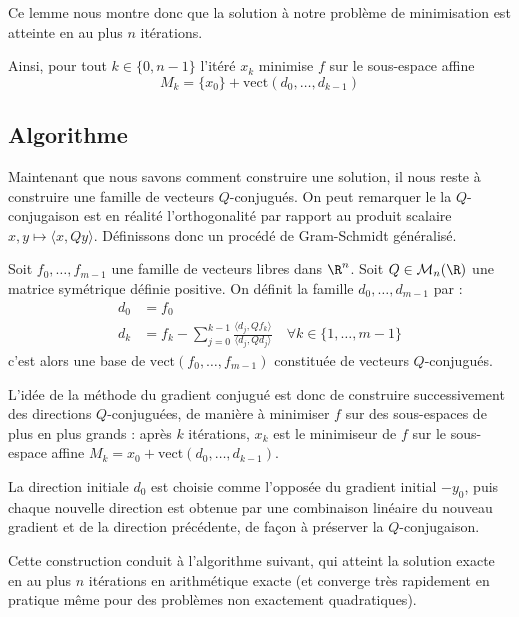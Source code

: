 Ce lemme nous montre donc que la solution à notre problème de minimisation est atteinte en au plus $n$ itérations. 

\begin{proposition}
    Ainsi, pour tout $ k \in \{0, n-1\}$ l'itéré $x_k$ minimise $f$ sur le sous-espace affine 
        $$ M_k = \{x_0\} + \text{vect}(d_0, \dots, d_{k-1})$$  
\end{proposition}

\subsection{Algorithme}

Maintenant que nous savons comment construire une solution, il nous reste à construire une famille de 
vecteurs $Q$-conjugués. On peut remarquer le la $Q$-conjugaison est en réalité l'orthogonalité par rapport 
au produit scalaire $ x,y \longmapsto \langle x, Qy \rangle $. 
Définissons donc un procédé de Gram-Schmidt généralisé. 

\begin{proposition}
    Soit $f_0, \dots, f_{m-1}$ une famille de vecteurs libres dans $\R^n$. Soit $Q \in \mathcal{M}_{n}(\R)$ une matrice 
    symétrique définie positive. On définit la famille $d_0, \dots, d_{m-1}$ par : 
        \begin{align*}
            d_0 &= f_0 \\ 
            d_k &= f_k - \sum_{j=0}^{k-1} \frac{ \langle d_j, Q f_k \rangle }{ \langle d_j, Q d_j \rangle }  \quad \forall k \in \{1, \dots, m-1\}
        \end{align*}
    c'est alors une base de $ \text{vect}(f_0, \dots, f_{m-1})$ constituée de vecteurs $Q$-conjugués.  
\end{proposition}

L'idée de la méthode du gradient conjugué est donc de construire successivement des directions 
$Q$-conjuguées, de manière à minimiser $f$ sur des sous-espaces de plus en plus grands : 
après $k$ itérations, $x_k$ est le minimiseur de $f$ sur le sous-espace affine 
$M_k = x_0 + \mathrm{vect}(d_0, \dots, d_{k-1})$. 


La direction initiale $d_0$ est choisie comme l'opposée du gradient initial $-y_0$, 
puis chaque nouvelle direction est obtenue par une combinaison linéaire du nouveau gradient et de la direction précédente, 
de façon à préserver la $Q$-conjugaison. 


Cette construction conduit à l'algorithme suivant, qui atteint la solution exacte 
en au plus $n$ itérations en arithmétique exacte (et converge très rapidement en pratique 
même pour des problèmes non exactement quadratiques).


